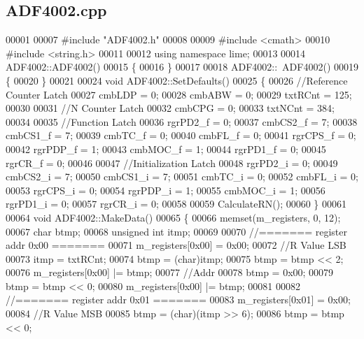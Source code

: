 \subsection{A\+D\+F4002.\+cpp}
\label{ADF4002_8cpp_source}

\begin{DoxyCode}
00001 
00007 \textcolor{preprocessor}{#include "ADF4002.h"}
00008 
00009 \textcolor{preprocessor}{#include <cmath>}
00010 \textcolor{preprocessor}{#include <string.h>}
00011 
00012 \textcolor{keyword}{using namespace }lime;
00013 
00014 ADF4002::ADF4002()
00015 \{
00016 \}
00017 
00018 ADF4002::~ADF4002()
00019 \{
00020 \}
00021 
00024 \textcolor{keywordtype}{void} ADF4002::SetDefaults()
00025 \{
00026     \textcolor{comment}{//Reference Counter Latch}
00027     cmbLDP = 0;
00028     cmbABW = 0;
00029     txtRCnt = 125;
00030 
00031     \textcolor{comment}{//N Counter Latch}
00032     cmbCPG = 0;
00033     txtNCnt = 384;
00034 
00035     \textcolor{comment}{//Function Latch}
00036     rgrPD2_f = 0;
00037     cmbCS2_f = 7;
00038     cmbCS1_f = 7;
00039     cmbTC_f = 0;
00040     cmbFL_f = 0;
00041     rgrCPS_f = 0;
00042     rgrPDP_f = 1;
00043     cmbMOC_f = 1;
00044     rgrPD1_f = 0;
00045     rgrCR_f = 0;
00046 
00047     \textcolor{comment}{//Initialization Latch}
00048     rgrPD2_i = 0;
00049     cmbCS2_i = 7;
00050     cmbCS1_i = 7;
00051     cmbTC_i = 0;
00052     cmbFL_i = 0;
00053     rgrCPS_i = 0;
00054     rgrPDP_i = 1;
00055     cmbMOC_i = 1;
00056     rgrPD1_i = 0;
00057     rgrCR_i = 0;
00058 
00059     CalculateRN();
00060 \}
00061 
00064 \textcolor{keywordtype}{void} ADF4002::MakeData()
00065 \{
00066     memset(m_registers, 0, 12);
00067     \textcolor{keywordtype}{char} btmp;
00068     \textcolor{keywordtype}{unsigned} \textcolor{keywordtype}{int} itmp;
00069 
00070     \textcolor{comment}{//======= register addr 0x00 =======}
00071     m_registers[0x00] = 0x00;
00072     \textcolor{comment}{//R Value LSB}
00073     itmp = txtRCnt;
00074     btmp = (char)itmp;
00075     btmp = btmp << 2;
00076     m_registers[0x00] |= btmp;
00077     \textcolor{comment}{//Addr}
00078     btmp = 0x00;
00079     btmp = btmp << 0;
00080     m_registers[0x00] |= btmp;
00081 
00082     \textcolor{comment}{//======= register addr 0x01 =======}
00083     m_registers[0x01] = 0x00;
00084     \textcolor{comment}{//R Value MSB}
00085     btmp = (char)(itmp >> 6);
00086     btmp = btmp << 0;

\end{DoxyCode}
